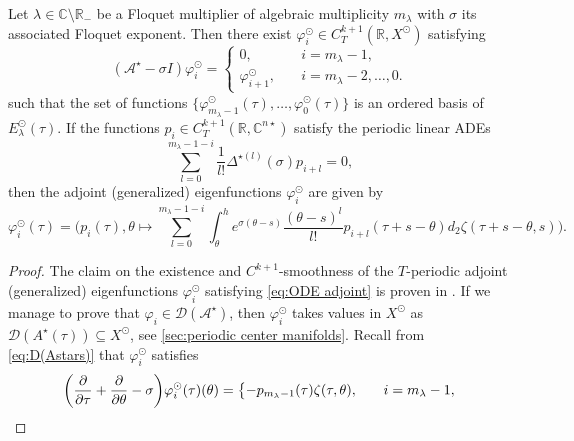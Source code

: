 \documentclass[english]{myarticle}
\begin{document}
\begin{sloppypar}
\begin{theorem} \label{thm:adjoint eigenfunctions2}
Let $\lambda \in \mathbb{C} \setminus \mathbb{R}_{-}$ be a Floquet multiplier of algebraic multiplicity $m_\lambda$ with $\sigma$ its associated Floquet exponent. Then there exist $\varphi_{i}^\odot \in C_T^{k+1}(\mathbb{R},X^\odot)$ satisfying
\begin{equation} \label{eq:ODE adjoint}
    (\mathcal{A}^\star - \sigma I)\varphi_i^\odot=
    \begin{cases}
    0, \quad &i = m_\lambda-1,\\
    \varphi_{i+1}^\odot, \quad &i=m_\lambda-2,\dots,0.
    \end{cases}
\end{equation}
such that the set of functions $\{\varphi_{m_\lambda - 1}^\odot(\tau),\dots,\varphi_{0}^\odot(\tau) \}$ is an ordered basis of $E_\lambda^\odot(\tau)$. If the functions  $p_i \in C_T^{k + 1}(\mathbb{R},\mathbb{C}^{n \star})$ satisfy the periodic linear ADEs
\begin{equation} \label{eq:p_i}
\sum_{l=0}^{m_\lambda - 1 - i} \frac{1}{l!}\Delta^{\star (l)} (\sigma)  p_{i+l} = 0,
\end{equation}
then the adjoint (generalized) eigenfunctions $\varphi_i^\odot$ are given by
\begin{equation} \label{eq:varphi_i^sun}
    \varphi_i^\odot(\tau) = \bigg( p_{i}(\tau), \theta \mapsto \sum_{l = 0}^{m_\lambda - 1 - i} \int_\theta^h e^{\sigma(\theta - s)} \frac{(\theta -s)^l}{l!} p_{i+l}(\tau+s-\theta) d_2\zeta(\tau+s-\theta,s) \bigg).
\end{equation}
\end{theorem}
\begin{proof}
The claim on the existence and $C^{k+1}$-smoothness of the $T$-periodic adjoint (generalized) eigenfunctions $\varphi_i^\odot$ satisfying \eqref{eq:ODE adjoint} is proven in \cite[Theorem 8]{Article1}. If we manage to prove that $\varphi_i \in \mathcal{D}(\mathcal{A}^\star)$, then $\varphi_i^\odot$ takes values in $X^\odot$ as $\mathcal{D}(A^\star(\tau)) \subseteq X^\odot$, see \cref{sec:periodic center manifolds}. Recall from \eqref{eq:D(Astars)} that $\varphi_i^{\odot}$ satisfies
\begin{equation} \label{eq:PDEadjoint}
    \bigg( \frac{\partial}{\partial \tau} + \frac{\partial}{\partial \theta} - \sigma \bigg) \varphi_i^{\odot}(\tau)(\theta) = 
    \begin{dcases}
    -p_{m_\lambda - 1}(\tau)\zeta(\tau,\theta), \quad &i = m_\lambda - 1, \\

\end{dcases}
\end{equation}
\end{proof}
\end{sloppypar}
\end{document}
